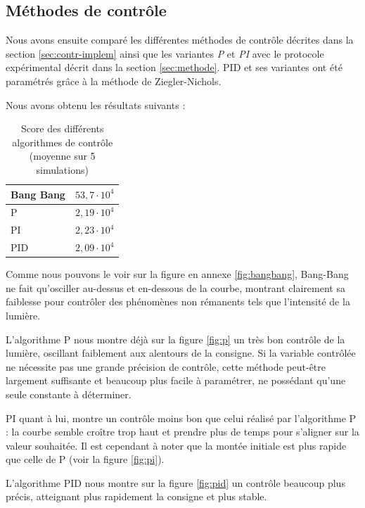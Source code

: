 \documentclass[a4paper,10pt]{report}
\begin{document}
\subsection{Méthodes de contrôle}

Nous avons ensuite comparé les différentes méthodes de contrôle décrites dans la section \ref{sec:contr-implem} ainsi que les variantes \textit{P} et \textit{PI} avec le protocole expérimental décrit dans la section \ref{sec:methode}.
PID et ses variantes ont été paramétrés grâce à la méthode de Ziegler-Nichols.

Nous avons obtenu les résultats suivants :

\begin{table}[H]
\begin{center}
    \begin{tabular}{|l|l|}
        \hline
        Bang Bang & $53,7 \cdot 10^4$ \\ \hline
        P         & $2,19 \cdot 10^4$ \\ \hline
        PI        & $2,23 \cdot 10^4$ \\ \hline
        PID       & $2,09 \cdot 10^4$ \\
        \hline
    \end{tabular}
\end{center}
\caption{Score des différents algorithmes de contrôle (moyenne sur 5 simulations)}
\end{table}


Comme nous pouvons le voir sur la figure en annexe \ref{fig:bangbang}, Bang-Bang ne fait qu'osciller au-dessus et en-dessous de la courbe, montrant clairement sa faiblesse pour contrôler des phénomènes non rémanents tels que l'intensité de la lumière.

L'algorithme P nous montre déjà sur la figure \ref{fig:p} un très bon contrôle de la lumière, oscillant faiblement aux alentours de la consigne.
Si la variable contrôlée ne nécessite pas une grande précision de contrôle, cette méthode peut-être largement suffisante et beaucoup plus facile à paramétrer, ne possédant qu'une seule constante à déterminer.

PI quant à lui, montre un contrôle moins bon que celui réalisé par l'algorithme P :
la courbe semble croître trop haut et prendre plus de temps pour s'aligner sur la valeur souhaitée.
Il est cependant à noter que la montée initiale est plus rapide que celle de P (voir la figure \ref{fig:pi}).

L'algorithme PID nous montre sur la figure \ref{fig:pid} un contrôle beaucoup plus précis, atteignant plus rapidement la consigne et plus stable.
\end{document}
